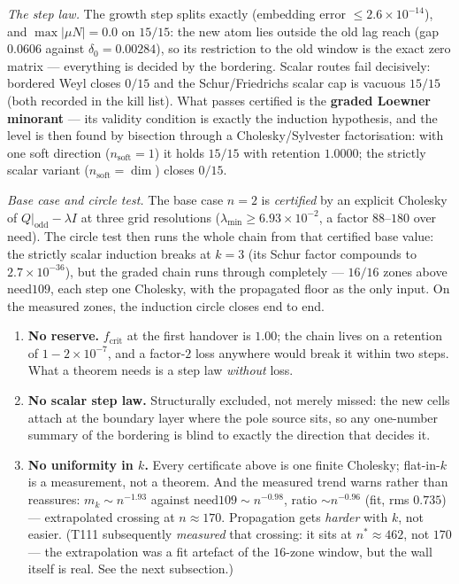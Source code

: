 \documentclass[11pt,a4paper]{article}
\begin{document}
\emph{The step law.} The growth step splits exactly (embedding error $\le2.6\times10^{-14}$), and
$\max|\mu N|=0.0$ on $15/15$: the new atom lies outside the old lag reach (gap $0.0606$ against
$\delta_0=0.00284$), so its restriction to the old window is the exact zero matrix --- everything is
decided by the bordering. Scalar routes fail decisively: bordered Weyl closes $0/15$ and the
Schur/Friedrichs scalar cap is vacuous $15/15$ (both recorded in the kill list). What passes certified
is the \textbf{graded Loewner minorant} --- its validity condition is exactly the induction
hypothesis, and the level is then found by bisection through a Cholesky/Sylvester factorisation: with
one soft direction ($n_{\mathrm{soft}}=1$) it holds $15/15$ with retention $1.0000$; the strictly
scalar variant ($n_{\mathrm{soft}}=\dim$) closes $0/15$.

\emph{Base case and circle test.} The base case $n=2$ is \emph{certified} by an explicit Cholesky of
$Q|_{\mathrm{odd}}-\lambda I$ at three grid resolutions ($\lambda_{\min}\ge6.93\times10^{-2}$, a
factor $88$--$180$ over need). The circle test then runs the whole chain from that certified base
value: the strictly scalar induction breaks at $k=3$ (its Schur factor compounds to
$2.7\times10^{-36}$), but the graded chain runs through completely --- $16/16$ zones above
$\mathrm{need109}$, each step one Cholesky, with the propagated floor as the only input. On the
measured zones, the induction circle closes end to end.

\begin{keybox}
\begin{enumerate}[leftmargin=1.6em]
\item \textbf{No reserve.} $f_{\mathrm{crit}}$ at the first handover is $1.00$; the chain lives on a
retention of $1-2\times10^{-7}$, and a factor-$2$ loss anywhere would break it within two steps. What
a theorem needs is a step law \emph{without} loss.
\item \textbf{No scalar step law.} Structurally excluded, not merely missed: the new cells attach at
the boundary layer where the pole source sits, so any one-number summary of the bordering is blind to
exactly the direction that decides it.
\item \textbf{No uniformity in $k$.} Every certificate above is one finite Cholesky; flat-in-$k$ is a
measurement, not a theorem. And the measured trend warns rather than reassures: $m_k\sim n^{-1.93}$
against $\mathrm{need109}\sim n^{-0.98}$, ratio $\sim n^{-0.96}$ (fit, rms $0.735$) --- extrapolated
crossing at $n\approx170$. Propagation gets \emph{harder} with $k$, not easier. (T111 subsequently
\emph{measured} that crossing: it sits at $n^*\approx462$, not $170$ --- the extrapolation was a fit
artefact of the $16$-zone window, but the wall itself is real. See the next subsection.)
\end{enumerate}
\end{keybox}
\end{document}
